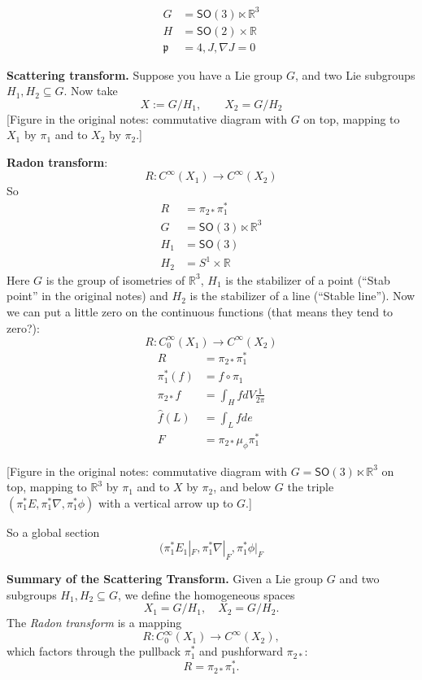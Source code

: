 $$
\begin{aligned}
G &= \mathsf{SO}(3)\ltimes \mathbb{R}^3 \\
H &= \mathsf{SO}(2) \times \mathbb{R} \\
\mathfrak{p} &= 4, J, \nabla J=0
\end{aligned}
$$

\medskip\noindent
{\bf Scattering transform.}
Suppose you have a Lie group $G$, and two Lie
subgroups $H_1, H_2 \subseteq G$. Now take
$$
X:=G/H_1, \qquad X_2=G/H_2
$$
[Figure in the original notes: commutative
diagram with $G$ on top, mapping to $X_1$ by
$\pi_1$ and to $X_2$ by $\pi_2$.]

{\bf Radon transform}:
$$
R: C^\infty(X_1) \longrightarrow
C^\infty(X_2)
$$
So
$$
\begin{aligned}
R &= \pi_{2 *}\pi_1^* \\
G &= \mathsf{SO}(3)\ltimes \mathbb{R}^3 \\
H_1 &= \mathsf{SO}(3) \\
H_2 &= S^1 \times \mathbb{R}
\end{aligned}
$$
Here $G$ is the group of isometries of
$\mathbb{R}^3$, $H_1$ is the stabilizer of a
point (``Stab point'' in the original notes)
and $H_2$ is the stabilizer of a line
(``Stable line''). Now we can put a little
zero on the continuous functions (that means
they tend to zero?):
$$
R: C_0^\infty(X_1) \longrightarrow
C^\infty(X_2)
$$
$$
\begin{aligned}
R &= \pi_{2*}\pi_1^* \\
\pi_1^* (f) &= f \circ \pi_1 \\
\pi_{2*}f &= \int_HfdV\frac{1}{2\pi} \\
\hat{f}(L) &= \int_Lfde \\
F &= \pi_{2*}\mu_{\phi}\pi_1^*
\end{aligned}
$$

[Figure in the original notes: commutative
diagram with $G=\mathsf{SO}(3)\ltimes
\mathbb{R}^3$ on top, mapping to
$\mathbb{R}^3$ by $\pi_1$ and to $X$ by
$\pi_2$, and below $G$ the triple
$(\pi_1^*E,\pi_1^*\nabla,\pi^*_1\phi)$ with a
vertical arrow up to $G$.]

So a global section
$$
(\pi_1^*E_1|_{F},
\pi_1^*\nabla|_{F},
\pi_1^*\phi|_{F}
$$

\medskip\noindent
{\bf Summary of the Scattering Transform.}
Given a Lie group $G$ and two subgroups $H_1,
H_2 \subseteq G$, we define the homogeneous
spaces
$$
X_1 = G/H_1, \quad X_2 = G/H_2.
$$
The \emph{Radon transform} is a mapping
$$
R: C^\infty_0(X_1) \to C^\infty(X_2),
$$
which factors through the pullback $\pi_1^*$
and pushforward $\pi_{2*}$:
$$
R = \pi_{2*} \pi_1^*.
$$

